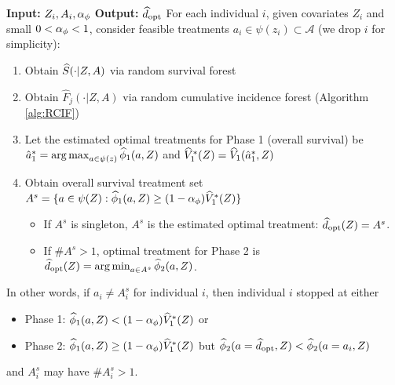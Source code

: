 \begin{algorithm}[H]
  \caption{The proposed ITR estimator accounting for competing risks.}
  \label{alg:Overview}
  \begin{flushleft}
  \begin{algorithmic}
  \State \textbf{Input:} $Z_i, A_i, \alpha_{\phi}$
  \State \textbf{Output:} $\widehat{d}_{\text{opt}}$
  \State For each individual $i$, given covariates $Z_i$ and small $0<\alpha_{\phi}<1$, consider feasible treatments $a_i \in \psi(z_i) 
  \subset \mathcal{A}$ (we drop $i$ for simplicity):
  \begin{enumerate}
    \item Obtain $\widehat{S}(\cdot|Z,A)$ via random survival forest \citep{cho_multi-stage_2023}
    \item Obtain $\widehat{F}_j(\cdot|Z,A)$ via random cumulative incidence forest (Algorithm \ref{alg:RCIF})
    \item Let the estimated optimal treatments for Phase 1 (overall survival) be $\hat{a}_1^* = \operatorname*{arg\,max}_{a \in \psi(z)}\widehat{\phi}_1(a,Z)$ and $\widehat{V}_1^*(Z) = \widehat{V}_1(\hat{a}_1^*,Z)$
    \item Obtain overall survival treatment set $A^s = \{a \in \psi(Z): \widehat{\phi}_1(a,Z) \ge (1- \alpha_{\phi})\widehat{V}_1^*(Z) \}$
        \begin{itemize}
            \item If $A^s$ is singleton, $A^s$ is the estimated optimal treatment: $\widehat{d}_{\text{opt}}(Z) = A^s$.
            \item If $\#A^s > 1$, optimal treatment for Phase 2 is $\widehat{d}_{\text{opt}}(Z) = \operatorname*{arg\,min}_{a \in \textit{A}^s} \widehat{\phi}_2(a,Z)$.
        \end{itemize} 
    \end{enumerate}
  \State In other words, if $a_i \neq A^s_i$ for individual $i$, then individual $i$ stopped at either 
    \begin{itemize}[label={}]
      \item \hspace{1em} Phase 1: $\widehat{\phi}_1(a,Z) < (1-\alpha_{\phi})\widehat{V}_1^*(Z)$ or
      \item \hspace{1em} Phase 2: $\widehat{\phi}_1(a,Z) \ge (1-\alpha_{\phi}) \widehat{V}_1^*(Z)$ but $\widehat{\phi}_2(a = \widehat{d}_{\text{opt}}, Z) < \widehat{\phi}_2(a = a_i, Z)$
  \end{itemize}
and $A_i^s$ may have $\#A_i^s>1$.
\end{algorithmic}
\end{flushleft}
\end{algorithm}
